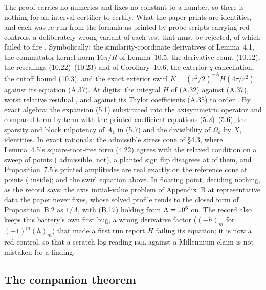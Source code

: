 \documentclass[11pt]{article}
\begin{document}
The proof carries no numerics and fixes no constant to a number, so there is nothing for an
interval certifier to certify. What the paper prints are identities, and each was re-run
from the formula as printed by \ProbeScripts{} probe scripts carrying \ProbeReds{} red
controls, a deliberately wrong variant of each test that must be rejected, \ProbeRedsDead{}
of which failed to fire \cite{Records}. Symbolically: the similarity-coordinate derivatives
of Lemma~4.1, the commutator kernel norm $16\pi/R$ of Lemma~10.5, the derivative count
(10.12), the rescalings (10.22)--(10.23) and of Corollary~10.6, the exterior
$q$-cancellation, the cutoff bound (10.3), and the exact exterior swirl
$K=(r^2/2)^{-A}H(4\tau/r^2)$ against its equation (A.37). At \HeatDigits{} digits: the
integral $H$ of (A.32) against (A.37), worst relative residual \HeatResidual, and against
its Taylor coefficients (A.35) to order \HeatTaylorOrder. By exact algebra: the expansion
(5.1) substituted into the axisymmetric operator and compared term by term with the printed
coefficient equations (5.2)--(5.6), the sparsity and block nilpotency of $A_1$ in (5.7) and
the divisibility of $\Omega_k$ by $X$, \CoeffIdentities{} identities. In exact rationals:
the admissible stress cone of \S4.3, where Lemma~4.5's square-root-free form (4.22) agrees
with the relaxed condition on a sweep of \ConeSweepPoints{} points (\ConeAdmissible{}
admissible, \ConeNotAdmissible{} not), a planted sign flip disagrees at
\ConeSignFlipDisagree{} of them, and Proposition~7.5's printed amplitudes are real exactly on
the reference cone at \ConeRefPoints{} points (\ConeRefInside{} inside); and the swirl
equation above. In floating point, deciding nothing, as the record says: the axis
initial-value problem of Appendix~B at representative data the paper never fixes, whose
solved profile tends to the closed form of Proposition~B.2 as $1/\Lambda$, with (B.17)
holding from $\Lambda=10^{6}$ on. The record also keeps this battery's own first
bug, a wrong derivative factor ($(-h)_m$ for $(-1)^m(h)_m$) that made a first run report $H$
failing its equation; it is now a red control, so that a scratch log reading \textsc{fail}
against a Millennium claim is not mistaken for a finding.

\subsection{The companion theorem}\label{sec:euler}
\end{document}
